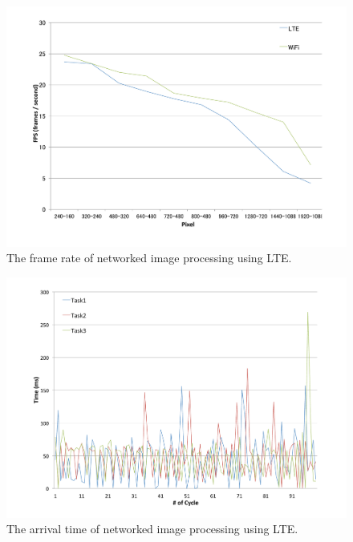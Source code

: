 \begin{figure}[!t]
 \centering
 \includegraphics[width=\hsize]{fig/No10_TIPiC_FPS_graph_LTE.pdf}
 \caption{The frame rate of networked image processing using LTE.}
 \label{fig:no10}
\end{figure}

\begin{figure}[!t]
 \centering
 \includegraphics[width=\hsize]{fig/No11_TIPiC_serv_cycle_LTE.pdf}
 \caption{The arrival time of networked image processing using LTE.}
 \label{fig:no11}
\end{figure}

